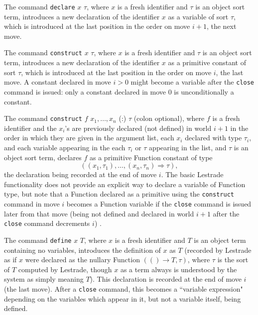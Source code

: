 \documentclass{article}
\begin{document}
The command {\tt declare} $x$ $\tau$, where $x$ is a fresh identifier and $\tau$ is an object sort term, introduces a new declaration of the identifier $x$
as a variable of sort $\tau$, which is introduced at the last position in the order on move $i+1$, the next move.

The command {\tt construct} $x$ $\tau$, where $x$ is a fresh identifier and $\tau$ is an object sort term, introduces a new declaration of the identifier
$x$ as a primitive constant of sort $\tau$, which is introduced at the last position in the order on move $i$, the last move.  A constant declared in move $i>0$ might become a variable after the {\tt close} command is issued:  only a constant declared in move 0 is unconditionally a constant.

The command {\tt construct} $f$ $x_1, \ldots,x_n$ (:) $\tau$ (colon optional), where $f$ is a fresh identifier and the $x_i$'s are previously declared (not defined) in world $i+1$ in the order in which they are given in the argument list, each $x_i$ declared with type $\tau_i$, and each variable appearing in the each $\tau_i$ or $\tau$ appearing in the list, and $\tau$ is an object sort term, declares $f$ as a primitive Function constant of type
$$((x_1,\tau_1),\ldots,(x_n,\tau_n) \Rightarrow \tau),$$ the declaration being recorded at the end of move $i$.  The basic Lestrade functionality does not provide an explicit way to declare a variable of Function type, but note that a Function declared as a primitive using the {\tt construct} command in move $i$ becomes a Function variable if the {\tt close} command is issued later from that move (being not defined and declared in world $i+1$ after the {\tt close} command decrements $i$) .

The command {\tt define} $x$ $T$, where $x$ is a fresh identifier and $T$ is an object term containing no variables, introduces the definition of $x$ as $T$ (recorded by Lestrade
as if $x$ were declared as the nullary  Function $(() \rightarrow T,\tau)$, where $\tau$ is the sort of $T$ computed by Lestrade, though $x$ as a term always is understood by the system as simply meaning $T$).  This declaration is recorded at the end of move $i$ (the last move).  After a {\tt close} command, this becomes a ``variable expression" depending on the variables which appear in it, but not a variable itself, being defined.
\end{document}
